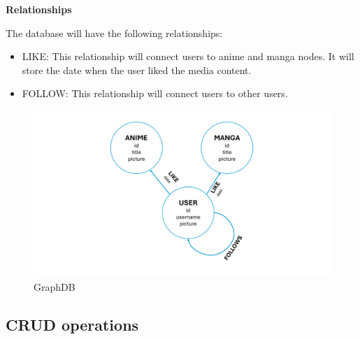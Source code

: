 \textbf{Relationships}

The database will have the following relationships:
\begin{itemize}
    \item LIKE: This relationship will connect users to anime and manga nodes. It will store the date when the user liked the media content.
    \item FOLLOW: This relationship will connect users to other users. 
\end{itemize}

\begin{figure}[htbp]
    \centering
    \includegraphics[width=\textwidth]{Media/graph.pdf}
    \caption{GraphDB}
    \label{fig:GraohDB}
\end{figure}

\newpage

\subsection{CRUD operations}

